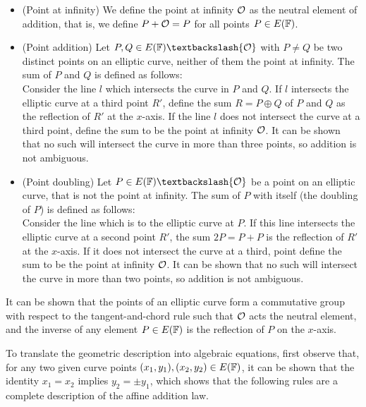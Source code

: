 \begin{definition}{}\label{def:chord-and-tangent}
\begin{itemize}
\item (Point at infinity) We define the point at infinity $\mathcal{O}$ as the neutral element of addition, that is, we define $P+\mathcal{O} = P$ for all points $P\in E(\mathbb{F})$.
\item (Point addition) Let $P, Q\in E(\F)\textbackslash \{\Oinf\}$ with $P\neq Q$ be two distinct points on an elliptic curve, neither of them the point at infinity. The sum of $P$ and $Q$ is defined as follows:\\
Consider the line $l$ which intersects the curve in $P$ and $Q$. If $l$ intersects the elliptic curve at a third point $R'$, define the sum $R=P\oplus Q$ of $P$ and $Q$ as the reflection of $R'$ at the $x$-axis. If the line $l$ does not intersect the curve at a third point, define the sum to be the point at infinity $\mathcal{O}$. It can be shown that no such  will intersect the curve in more than three points, so addition is not ambiguous.
\item (Point doubling) Let $P \in E(\F)\textbackslash \{\Oinf\}$ be a point on an elliptic curve, that is not the point at infinity. The sum of $P$ with itself (the doubling of $P$) is defined as follows:\\
Consider the line which is  to the elliptic curve at $P$. If this line intersects the elliptic curve at a second point $R'$, the sum $2P=P+P$ is the reflection of $R'$ at the $x$-axis. If it does not intersect the curve at a third, point define the sum to be the point at infinity $\mathcal{O}$. It can be shown that no such  will intersect the curve in more than two points, so addition is not ambiguous.
\end{itemize}
\end{definition}

It can be shown that the points of an elliptic curve form a commutative group with respect to the tangent-and-chord rule such that $\mathcal{O}$ acts the neutral element, and the inverse of any element $P\in E(\mathbb{F})$ is the reflection of $P$ on the $x$-axis.

To translate the geometric description into algebraic equations, first observe that, for any two given curve points $(x_1,y_1), (x_2,y_2)\in E(\mathbb{F})$, it can be shown that the identity $x_1=x_2$ implies $y_2=\pm y_1$, which shows that the following rules are a complete description of the affine addition law.

